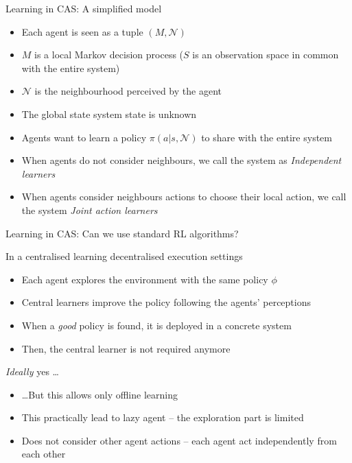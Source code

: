 \documentclass[presentation]{beamer}\mode<presentation>{\usetheme{AMSBolognaFC}}
\begin{document}
\begin{frame}{Learning in CAS: A simplified model}
	\begin{exampleblock}{}		
		\begin{itemize}
			\item Each agent is seen as a tuple $(M, \mathcal{N})$
			\item $M$ is a local Markov decision process ($S$ is an observation space in common with the entire system)
			\item $\mathcal{N}$ is the neighbourhood perceived by the agent
			\item The global state system state is unknown
			\item Agents want to learn a policy $\pi(a | s, \mathcal{N})$ to share with the entire system
			\item When agents do not consider neighbours, we call the system as \emph{Independent learners}
			\item When agents consider neighbours actions to choose their local action, we call the system \emph{Joint action learners} 
		
		\end{itemize}
	\end{exampleblock}
\end{frame}

\begin{frame}{Learning in CAS: Can we use standard RL algorithms?}
	\begin{exampleblock}{In a centralised learning decentralised execution settings}
		\begin{itemize}
			\item Each agent explores the environment with the same policy $\phi$
			\item Central learners improve the policy following the agents' perceptions
			\item When a \emph{good} policy is found, it is deployed in a concrete system
			\item Then, the central learner is not required anymore
		\end{itemize}
	\end{exampleblock}
	\begin{exampleblock}{\emph{Ideally} yes \dots}
		\begin{itemize}
			\item \dots But this allows only offline learning
			\item This practically lead to lazy agent -- the exploration part is limited 
			\item Does not consider other agent actions -- each agent act independently from each other
		\end{itemize}
	\end{exampleblock}
\end{frame}
\end{document}
